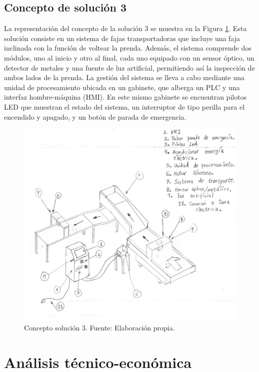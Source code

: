 \subsection{Concepto de solución 3}

La representación del concepto de la solución 3 se muestra en la Figura \ref{fig:sketch_CS_3}. Esta solución consiste en un sistema de fajas transportadoras que incluye una faja inclinada con la función de voltear la prenda. Además, el sistema comprende dos módulos, uno al inicio y otro al final, cada uno equipado con un sensor óptico, un detector de metales y una fuente de luz artificial, permitiendo así la inspección de ambos lados de la prenda. La gestión del sistema se lleva a cabo mediante una unidad de procesamiento ubicada en un gabinete, que alberga un PLC y una interfaz hombre-máquina (HMI). En este mismo gabinete se encuentran pilotos LED que muestran el estado del sistema, un interruptor de tipo perilla para el encendido y apagado, y un botón de parada de emergencia.

\begin{figure}[H]
	\centering
	\includegraphics[page=1,width=\textwidth]{img/sketch_CS.pdf}
	\caption[Concepto solución 3.]{Concepto solución 3. Fuente: Elaboración propia.}
	\label{fig:sketch_CS_3}
\end{figure}

\section{Análisis técnico-económica}

